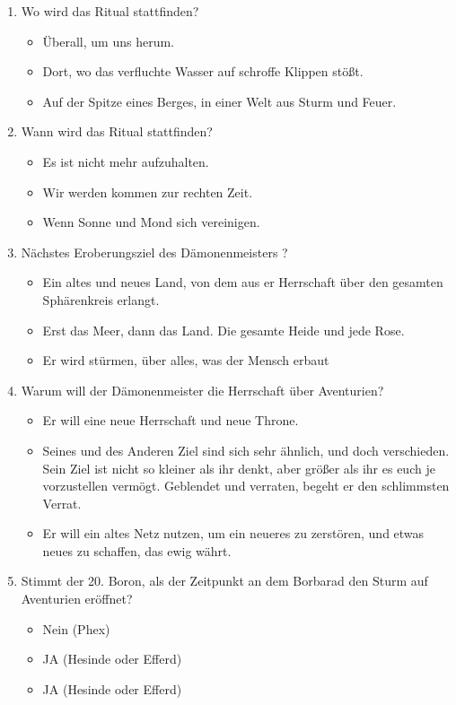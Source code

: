 \begin{enumerate}
\item Wo wird das Ritual stattfinden?
\begin{itemize}
\item Überall, um uns herum.
\item Dort, wo das verfluchte Wasser auf schroffe Klippen stößt.
\item Auf der Spitze eines Berges, in einer Welt aus Sturm und Feuer.
\end{itemize}
\item Wann wird das Ritual stattfinden?
\begin{itemize}
\item Es ist nicht mehr aufzuhalten.
\item Wir werden kommen zur rechten Zeit.
\item Wenn Sonne und Mond sich vereinigen.
\end{itemize}
\item Nächstes Eroberungsziel des Dämonenmeisters ?
\begin{itemize}
\item Ein altes und neues Land, von dem aus er Herrschaft über den gesamten Sphärenkreis erlangt.
\item Erst das Meer, dann das Land. Die gesamte Heide und jede Rose.
\item Er wird stürmen, über alles, was der Mensch erbaut
\end{itemize}
\item Warum will der Dämonenmeister die Herrschaft über Aventurien?
\begin{itemize}
\item Er will eine neue Herrschaft und neue Throne.
\item Seines und des Anderen Ziel sind sich sehr ähnlich, und doch verschieden. Sein Ziel ist nicht so kleiner als ihr denkt, aber größer als ihr es euch je vorzustellen vermögt. Geblendet und verraten, begeht er den schlimmsten Verrat.
\item Er will ein altes Netz nutzen, um ein neueres zu zerstören, und etwas neues zu schaffen, das ewig währt.
\end{itemize}
\item Stimmt der 20. Boron, als der Zeitpunkt an dem Borbarad den Sturm auf Aventurien eröffnet?
\begin{itemize}
\item Nein (Phex)
\item JA (Hesinde oder Efferd)
\item JA (Hesinde oder Efferd)

\end{itemize}
\end{enumerate}
